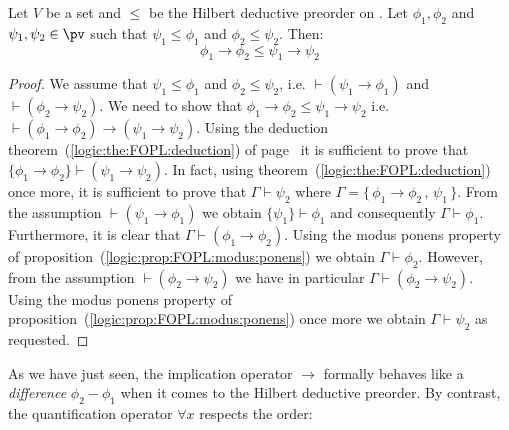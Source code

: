 \begin{prop}\label{logic:prop:FOPL:HDC:quasi:imp}
Let $V$ be a set and $\leq$ be the Hilbert deductive preorder on
\pv. Let $\phi_{1},\phi_{2}$ and $\psi_{1},\psi_{2}\in\pv$ such that
$\psi_{1}\leq\phi_{1}$ and $\phi_{2}\leq\psi_{2}$. Then:
    \[
    \phi_{1}\to\phi_{2}\leq\psi_{1}\to\psi_{2}
    \]
\end{prop}
\begin{proof}
We assume that $\psi_{1}\leq\phi_{1}$ and $\phi_{2}\leq\psi_{2}$,
i.e. $\vdash(\psi_{1}\to\phi_{1})$ and
$\vdash(\phi_{2}\to\psi_{2})$. We need to show that
$\phi_{1}\to\phi_{2}\leq\psi_{1}\to\psi_{2}$ i.e.
$\vdash(\phi_{1}\to\phi_{2})\to(\psi_{1}\to\psi_{2})$. Using the
deduction theorem~(\ref{logic:the:FOPL:deduction}) of
page~\pageref{logic:the:FOPL:deduction} it is sufficient to prove
that $\{\phi_{1}\to\phi_{2}\}\vdash(\psi_{1}\to\psi_{2})$. In fact,
using theorem~(\ref{logic:the:FOPL:deduction}) once more, it is
sufficient to prove that $\Gamma\vdash\psi_{2}$ where
$\Gamma=\{\,\phi_{1}\to\phi_{2}\,,\,\psi_{1}\,\}$. From the
assumption $\vdash(\psi_{1}\to\phi_{1})$ we obtain
$\{\psi_{1}\}\vdash\phi_{1}$ and consequently
$\Gamma\vdash\phi_{1}$. Furthermore, it is clear that
$\Gamma\vdash(\phi_{1}\to\phi_{2})$. Using the modus ponens property
of proposition~(\ref{logic:prop:FOPL:modus:ponens}) we obtain
$\Gamma\vdash\phi_{2}$. However, from the assumption
$\vdash(\phi_{2}\to\psi_{2})$ we have in particular
$\Gamma\vdash(\phi_{2}\to\psi_{2})$. Using the modus ponens property
of proposition~(\ref{logic:prop:FOPL:modus:ponens}) once more we
obtain $\Gamma\vdash\psi_{2}$ as requested.
\end{proof}

As we have just seen, the implication operator $\to$ formally
behaves like a {\em difference} $\phi_{2}-\phi_{1}$ when it comes to
the Hilbert deductive preorder. By contrast, the quantification
operator $\forall x$ respects the order:

